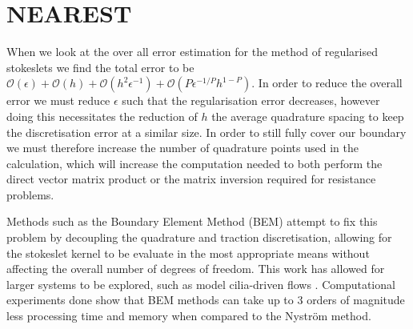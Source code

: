 \section{NEAREST} \label{sec:NEAREST}
When we look at the over all error estimation for the method of regularised stokeslets we find the total error to be $\mathcal{O}(\epsilon) + \mathcal{O}(h) + \mathcal{O}(h^2\epsilon^{-1}) + \mathcal{O}(P\epsilon^{-1/P} h^{1-P})$. In order to reduce the overall error we must reduce $\epsilon$ such that the regularisation error decreases, however doing this necessitates the reduction of $h$ the average quadrature spacing to keep the discretisation error at a similar size. In order to still fully cover our boundary we must therefore increase the number of quadrature points used in the calculation, which will increase the computation needed to both perform the direct vector matrix product or the matrix inversion required for resistance problems. 

Methods such as the Boundary Element Method (BEM) \cite{Smith2009AFlow} attempt to fix this problem by decoupling the quadrature and traction discretisation, allowing for the stokeslet kernel to be evaluate in the most appropriate means without affecting the overall number of degrees of freedom. This work has allowed for larger systems to be explored, such as model cilia-driven flows \cite{Sampaio2014Left-rightLaterality,Smith2012SymmetryEmbryo}. Computational experiments done show that BEM methods can take up to 3 orders of magnitude less processing time and memory \cite{Smith2009AFlow} when compared to the Nyström method.

